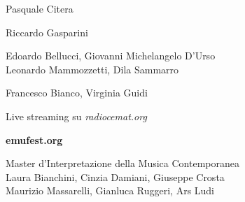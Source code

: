 \textbf{}

Pasquale Citera

\medskip




%

\medskip

\textbf{}

Riccardo Gasparini

\medskip

\textbf{}

Edoardo Bellucci, Giovanni Michelangelo D'Urso\\
Leonardo Mammozzetti, Dila Sammarro

\medskip

\textbf{}

Francesco Bianco, Virginia Guidi

\medskip

Live streaming su \emph{radiocemat.org}

\bigskip

\textbf{emufest.org}

\vfill

\textbf{}

Master d'Interpretazione della Musica Contemporanea\\
Laura Bianchini, Cinzia Damiani, Giuseppe Crosta\\
Maurizio Massarelli, Gianluca Ruggeri, Ars Ludi
